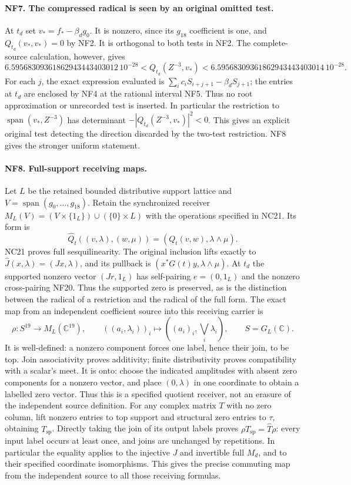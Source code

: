 \paragraph{NF7. The compressed radical is seen by an original omitted test.}
At $t_d$ set $v_*=f_*-\beta_dg_0$. It is nonzero, since its
$g_{18}$ coefficient is one, and $Q_{t_d}(v_*,v_*)=0$ by NF2.
It is orthogonal to both tests in NF2. The complete-source
calculation, however, gives
\[
 6.59568309361862943443403012\,10^{-28}
 <Q_{t_d}(Z^{-3},v_*)
 <6.59568309361862943443403014\,10^{-28}.
 \tag{NF20}
\]
For each $j$, the exact expression evaluated is
$\sum_i c_iS_{i+j+1}-\beta_dS_{j+1}$; the entries at $t_d$ are
enclosed by NF4 at the rational interval NF5. Thus no root
approximation or unrecorded test is inserted. In particular the
restriction to $\operatorname{span}(v_*,Z^{-3})$ has determinant
$-|Q_{t_d}(Z^{-3},v_*)|^2<0$. This gives an explicit original
test detecting the direction discarded by the two-test
restriction. NF8 gives the stronger uniform statement.

\paragraph{NF8. Full-support receiving maps.}
Let $L$ be the retained bounded distributive support lattice and
$V=\operatorname{span}(g_0,\ldots,g_{18})$. Retain the synchronized
receiver
$M_L(V)=(V\times\{1_L\})\cup(\{0\}\times L)$ with the
operations specified in NC21. Its form is
\[
 \widehat Q_t((v,\lambda),(w,\mu))
 =(Q_t(v,w),\lambda\wedge\mu).
 \tag{NF21}
\]
NC21 proves full sesquilinearity. The original inclusion lifts
exactly to $\widehat J(x,\lambda)=(Jx,\lambda)$, and its pullback
is $(x^*G(t)y,\lambda\wedge\mu)$. At $t_d$ the supported
nonzero vector $(Jr,1_L)$ has self-pairing $e=(0,1_L)$ and the
nonzero cross-pairing NF20. Thus the supported zero is preserved,
as is the distinction between the radical of a restriction and
the radical of the full form. The exact map from an independent
coefficient source into this receiving carrier is
\[
 \rho:S^{19}\longrightarrow M_L(\mathbb C^{19}),\qquad
 ((a_i,\lambda_i))_i\longmapsto
 ((a_i)_i,\bigvee_i\lambda_i),\qquad S=G_L(\mathbb C).
 \tag{NF22}
\]
It is well-defined: a nonzero component forces one label, hence
their join, to be top. Join associativity proves additivity;
finite distributivity proves compatibility with a scalar's meet.
It is onto: choose the indicated amplitudes with absent zero
components for a nonzero vector, and place $(0,\lambda)$ in one
coordinate to obtain a labelled zero vector. Thus this is a
specified quotient receiver, not an erasure of the independent
source definition. For any complex matrix $T$ with no zero column,
lift nonzero entries to top support and structural zero entries
to $\tau$, obtaining $T_{\mathrm{sp}}$. Directly taking the join
of its output labels proves
$\rho T_{\mathrm{sp}}=\widehat T\rho$:
every input label occurs at least once, and joins are unchanged
by repetitions. In particular the equality applies to the
injective $J$ and invertible full $M_d$, and to their specified
coordinate isomorphisms. This gives the precise commuting map
from the independent source to all those receiving formulas.

